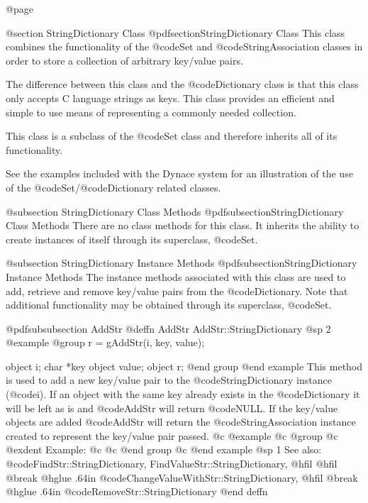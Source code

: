 @page

@section StringDictionary Class
@pdfsection{StringDictionary Class}
This class combines the functionality of the @code{Set}
and @code{StringAssociation} classes in order to store a collection of
arbitrary key/value pairs.

The difference between this class and the @code{Dictionary} class is
that this class only accepts C language strings as keys.  This class
provides an efficient and simple to use means of representing a
commonly needed collection.

This class is a subclass of the @code{Set} class and therefore inherits
all of its functionality.

See the examples included with the Dynace system for an illustration of the
use of the @code{Set}/@code{Dictionary} related classes.


@subsection StringDictionary Class Methods
@pdfsubsection{StringDictionary Class Methods}
There are no class methods for this class.  It inherits the ability
to create instances of itself through its superclass, @code{Set}.



@subsection StringDictionary Instance Methods
@pdfsubsection{StringDictionary Instance Methods}
The instance methods associated with this class are used to add, retrieve
and remove key/value pairs from the @code{Dictionary}.  Note that additional
functionality may be obtained through its superclass, @code{Set}.






@pdfsubsubsection {AddStr}
@deffn {AddStr} AddStr::StringDictionary
@sp 2
@example
@group
r = gAddStr(i, key, value);

object  i;
char    *key
object  value;
object  r;
@end group
@end example
This method is used to add a new key/value pair to the @code{StringDictionary}
instance (@code{i}).  If an object with the same key already exists in
the @code{Dictionary} it will be left as is and @code{AddStr} will return
@code{NULL}.  If the key/value objects are added @code{AddStr} will
return the @code{StringAssociation} instance created to represent the
key/value pair passed.
@c @example
@c @group
@c @exdent Example:
@c 
@c @end group
@c @end example
@sp 1
See also:  @code{FindStr::StringDictionary, FindValueStr::StringDictionary, @hfil}
@hfil @break @hglue .64in      @code{ChangeValueWithStr::StringDictionary,}
@hfil @break @hglue .64in      @code{RemoveStr::StringDictionary}
@end deffn










